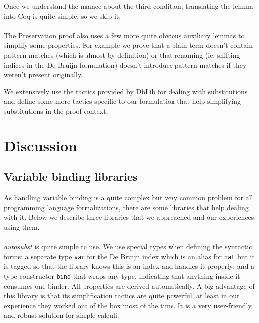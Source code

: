 \documentclass[runningheads]{article}
\begin{document}
Once we understand the nuance about the third condition, translating the lemma into Coq is quite simple, so we skip it.

\paragraph{}

The Preservation proof also uses a few more quite obvious auxiliary lemmas to simplify some properties. For example we prove that a plain term doesn't contain pattern matches (which is almost by definition) or that renaming (ie. shifting indices in the De Bruijn formulation) doesn't introduce pattern matches if they weren't present originally. %

We extensively use the tactics provided by DbLib for dealing with substitutions and define some more tactics specific to our formulation that help simplifying substitutions in the proof context.
\section{Discussion}
\subsection{Variable binding libraries}
\label{binderlibs}

As handling variable binding is a quite complex but very common problem for all programming language formalizations, there are some libraries that help dealing with it. Below we describe three libraries that we approached and our experiences using them.

\paragraph{}

\textit{autosubst} \cite{autosubst} is quite simple to use. We use special types when defining the syntactic forms: a separate type \verb|var| for the De Bruijn index which is an alias for \verb|nat| but it is tagged so that the library knows this is an index and handles it properly; and a type constructor \verb|bind| that wraps any type, indicating that anything inside it consumes one binder. All properties are derived automatically. A big advantage of this library is that its simplification tactics are quite powerful, at least in our experience they worked out of the box most of the time. It is a very user-friendly and robust solution for simple calculi.
\end{document}
